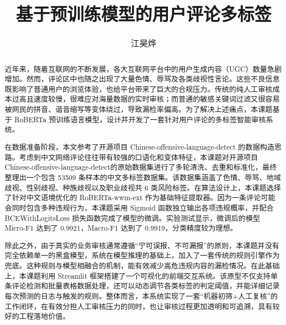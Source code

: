 \documentclass[twoside]{thesis-cls-Miya} %
\begin{document}
	
\title{基于预训练模型的用户评论多标签}

\author{江昊烨}


\maketitle

\frontmatter

\begin{abstract}
近年来，随着互联网的不断发展，各大互联网平台中的用户生成内容（UGC）数量急剧增加。然而，评论区中也随之出现了大量色情、辱骂及各类歧视性言论。这些不良信息既影响了普通用户的浏览体验，也给平台带来了巨大的合规压力。传统的纯人工审核成本过高且速度较慢，很难应对海量数据的实时审核；而普通的敏感关键词过滤又很容易被网民的拼音、谐音缩写等变体绕过，导致漏检率偏高。为了解决上述痛点，本课题基于 RoBERTa 预训练语言模型，设计并开发了一套针对用户评论的多标签智能审核系统。

在数据准备阶段，本文参考了开源项目 Chinese-offensive-language-detect 的数据构造思路。考虑到中文网络评论往往带有较强的口语化和变体特征，本课题对开源项目 Chinese-offensive-language-detect的原始数据集进行了多轮清洗、去重和标准化，最终整理出一个包含 53509 条样本的中文多标签数据集。该数据集涵盖了色情、辱骂、地域歧视、性别歧视、种族歧视以及职业歧视共 6 类风险标签。在算法设计上，本课题选择了针对中文语境优化的 RoBERTa-wwm-ext 作为基础特征提取器。因为一条评论可能会同时包含多种违规行为，本课题采用 Sigmoid 函数独立输出各项违规概率，并配合 BCEWithLogitsLoss 损失函数完成了模型的微调。实验测试显示，微调后的模型 Micro-F1 达到了 0.9921，Macro-F1 达到了 0.9919，分类精度较为理想。

除此之外，由于真实的业务审核通常遵循“宁可误报、不可漏报”的原则，本课题并没有完全依赖单一的黑盒模型，系统在模型推理的基础上，加入了一套传统的规则引擎作为兜底。这种规则与模型相融合的机制，能有效减少高危违规内容的漏检情况。在此基础上，本课题利用 Streamlit 框架搭建了一个可视化的前端交互系统。该原型不仅支持单条评论检测和批量表格数据处理，还可以动态调节各类标签的判定阈值，并能详细记录每次预测的日志与触发的规则。整体而言，本系统实现了一套“机器初筛+人工复核”的工作闭环，在有效分担人工审核压力的同时，也让审核过程更加透明和可追溯，具有较好的工程落地价值。

\end{abstract}
\end{document}
